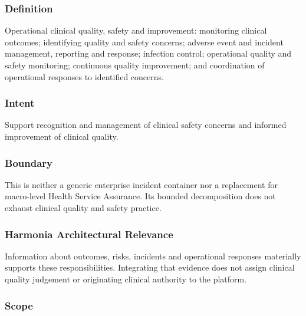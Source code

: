 \subsubsection*{Definition}

Operational clinical quality, safety and improvement: monitoring clinical outcomes; identifying quality and safety concerns; adverse event and incident management, reporting and response; infection control; operational quality and safety monitoring; continuous quality improvement; and coordination of operational responses to identified concerns.

\subsubsection*{Intent}

Support recognition and management of clinical safety concerns and informed improvement of clinical quality.

\subsubsection*{Boundary}

This is neither a generic enterprise incident container nor a replacement for macro-level Health Service Assurance. Its bounded decomposition does not exhaust clinical quality and safety practice.

\subsubsection*{Harmonia Architectural Relevance}

Information about outcomes, risks, incidents and operational responses materially supports these responsibilities. Integrating that evidence does not assign clinical quality judgement or originating clinical authority to the platform.

\subsubsection*{Scope}
